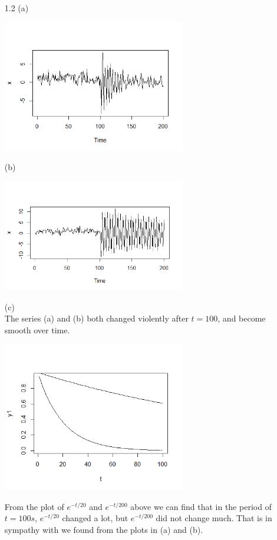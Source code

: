 \documentclass{article}
\begin{document}
\begin{CJK*}{GBK}{song}
\begin{enumerate}
\item[1.2]
(a)
\begin{center}
\includegraphics[width=8cm]{1.png}
\end{center}
(b)
\begin{center}
\includegraphics[width=8cm]{2.png}
\end{center}
(c)\\
The series (a) and (b) both changed violently after $t=100$, and become smooth over time.  
\begin{center}
\includegraphics[width=8cm]{3.png}
\end{center}
From the plot of $e^{-t/20}$ and $e^{-t/200}$ above we can find that in the period of $t=100s$, $e^{-t/20}$ changed a lot, but $e^{-t/200}$ did not change much. That is in sympathy with we found from the plots in (a) and (b).\\

\end{enumerate}
\end{CJK*}
\end{document}
